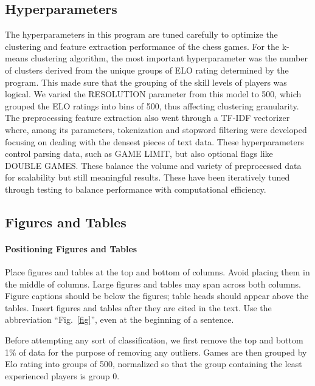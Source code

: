 \documentclass[conference]{IEEEtran}
\begin{document}
\subsection{Hyperparameters}
The hyperparameters in this program are tuned carefully to optimize the clustering and feature extraction performance of the chess games. For the k-means clustering algorithm, the most important hyperparameter was the number of clusters derived from the unique groups of ELO rating determined by the program. This made sure that the grouping of the skill levels of players was logical. We varied the RESOLUTION parameter from this model to 500, which grouped the ELO ratings into bins of 500, thus affecting clustering granularity. The preprocessing feature extraction also went through a TF-IDF vectorizer where, among its parameters, tokenization and stopword filtering were developed focusing on dealing with the densest pieces of text data. These hyperparameters control parsing data, such as GAME LIMIT, but also optional flags like DOUBLE GAMES. These balance the volume and variety of preprocessed data for scalability but still meaningful results. These have been iteratively tuned through testing to balance performance with computational efficiency.


\subsection{Figures and Tables}\label{}
\paragraph{Positioning Figures and Tables} Place figures and tables at the top and 
bottom of columns. Avoid placing them in the middle of columns. Large 
figures and tables may span across both columns. Figure captions should be 
below the figures; table heads should appear above the tables. Insert 
figures and tables after they are cited in the text. Use the abbreviation 
``Fig.~\ref{fig}'', even at the beginning of a sentence.

Before attempting any sort of classification, we first remove the top and bottom 1\% of data for the purpose of removing any outliers. Games are then grouped by Elo rating into groups of 500, normalized so that the group containing the least experienced players is group 0.
\end{document}
